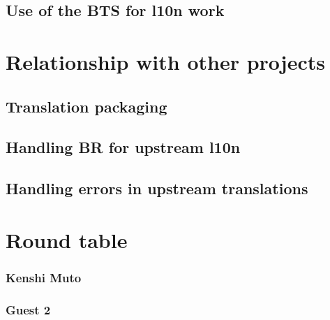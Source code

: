 \documentclass{beamer}
\begin{document}
\begin{frame}
  \frametitle{}
\end{frame}

\begin{frame}
  \frametitle{}
\end{frame}

\begin{frame}
  \frametitle{}
\end{frame}

\subsection{Use of the BTS for l10n work}

\begin{frame}
  \frametitle{}
\end{frame}

\begin{frame}
  \frametitle{}
\end{frame}

\section{Relationship with other projects}

\subsection{Translation packaging}

\begin{frame}
  \frametitle{}
\end{frame}

\subsection{Handling BR for upstream l10n}

\begin{frame}
  \frametitle{}
\end{frame}

\subsection{Handling errors in upstream translations}

\begin{frame}
  \frametitle{}
\end{frame}

\section{Round table}

\begin{frame}
  \frametitle{Kenshi Muto}
\end{frame}

\begin{frame}
  \frametitle{Guest 2}
\end{frame}
\end{document}
